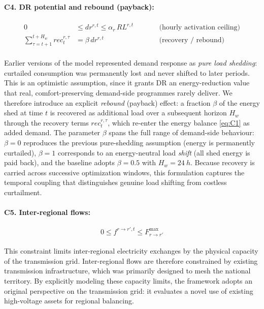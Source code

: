 \documentclass[12pt]{article}
\begin{document}
\paragraph{C4. DR potential and rebound (payback):}
\begin{subequations}\label{eq:C4}
\begin{alignat}{2}
0 &\le dr^{r,t} \le \alpha_r\, RL^{r,t}
   &\qquad&\text{(hourly activation ceiling)} \label{eq:C4a}\\[4pt]
\sum_{\tau = t+1}^{t+H_w} \!\! rec^{r,\tau}_{t}
  &= \beta\, dr^{r,t}
   &\qquad&\text{(recovery / rebound)} \label{eq:C4b}
\end{alignat}
\end{subequations}
\paragraph{}
Earlier versions of the model represented demand response as \emph{pure load shedding}: curtailed consumption was permanently lost and never shifted to later periods. This is an optimistic assumption, since it grants DR an energy-reduction value that real, comfort-preserving demand-side programmes rarely deliver. We therefore introduce an explicit \emph{rebound} (payback) effect: a fraction $\beta$ of the energy shed at time $t$ is recovered as additional load over a subsequent horizon $H_w$ through the recovery terms $rec^{r,\tau}_{t}$, which re-enter the energy balance \eqref{eq:C1} as added demand. The parameter $\beta$ spans the full range of demand-side behaviour: $\beta = 0$ reproduces the previous pure-shedding assumption (energy is permanently curtailed), $\beta = 1$ corresponds to an energy-neutral load \emph{shift} (all shed energy is paid back), and the baseline adopts $\beta = 0.5$ with $H_w = \SI{24}{h}$. Because recovery is carried across successive optimization windows, this formulation captures the temporal coupling that distinguishes genuine load shifting from costless curtailment.


\paragraph{C5. Inter-regional flows:}
\begin{equation}
0 \le f^{r \rightarrow r',t} \le F^{\max}_{r \rightarrow r'}
\end{equation}
\paragraph{}
This constraint limits inter-regional electricity exchanges by the physical capacity of the transmission grid. Inter-regional flows are therefore constrained by existing transmission infrastructure, which was primarily designed to mesh the national territory. By explicitly modeling these capacity limits, the framework adopts an original perspective on the transmission grid: it evaluates a novel use of existing high-voltage assets for regional balancing.
\end{document}
